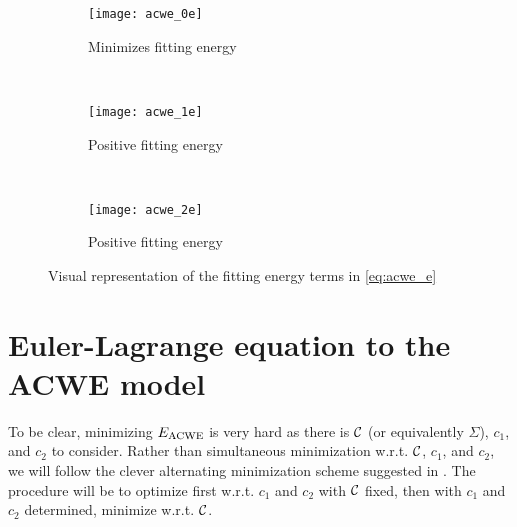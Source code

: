 \begin{figure}
	\centering
	\begin{subfigure}[b]{0.31\textwidth}
		\texttt{[image: acwe\_0e]}
		\caption{Minimizes fitting energy}
		\label{fig:gull}
	\end{subfigure}
	~ %
	\begin{subfigure}[b]{0.31\textwidth}
		\texttt{[image: acwe\_1e]}
		\caption{Positive fitting energy}
		\label{fig:tiger}
	\end{subfigure}
	~ %
	\begin{subfigure}[b]{0.31\textwidth}
		\texttt{[image: acwe\_2e]}
		\caption{Positive fitting energy}
		\label{fig:mouse}
	\end{subfigure}
	\caption{Visual representation of the fitting energy terms in \eqref{eq:acwe_e}}
	\label{fig:fitting}
\end{figure}


\section{Euler-Lagrange equation to the ACWE model}
To be clear, minimizing $E_\textrm{ACWE}$ is very hard as there is $\mathcal{C}$ (or equivalently $\Sigma$), $c_1$, and $c_2$ to consider. Rather than simultaneous minimization w.r.t. $\mathcal{C}$, $c_1$, and $c_2$, we will follow the clever alternating minimization scheme suggested in \cite{chan2001active}. The procedure will be to optimize first w.r.t. $c_1$ and $c_2$ with $\mathcal{C}$ fixed, then with $c_1$ and $c_2$ determined, minimize w.r.t. $\mathcal{C}$.


